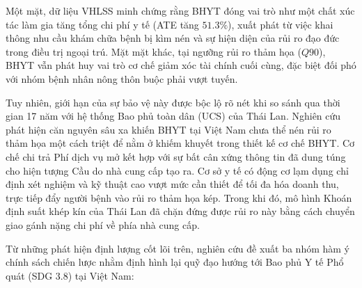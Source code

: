 \documentclass[12pt,a4paper]{article}
\begin{document}
Một mặt, dữ liệu VHLSS minh chứng rằng BHYT đóng vai trò như một chất xúc tác làm gia tăng tổng chi phí y tế (ATE tăng $51.3\%$), xuất phát từ việc khai thông nhu cầu khám chữa bệnh bị kìm nén và sự hiện diện của rủi ro đạo đức trong điều trị ngoại trú. Mặt mặt khác, tại ngưỡng rủi ro thảm họa ($Q90$), BHYT vẫn phát huy vai trò cơ chế giảm xóc tài chính cuối cùng, đặc biệt đối phó với nhóm bệnh nhân nông thôn buộc phải vượt tuyến. 

Tuy nhiên, giới hạn của sự bảo vệ này được bộc lộ rõ nét khi so sánh qua thời gian 17 năm với hệ thống Bao phủ toàn dân (UCS) của Thái Lan. Nghiên cứu phát hiện căn nguyên sâu xa khiến BHYT tại Việt Nam chưa thể nén rủi ro thảm họa một cách triệt để nằm ở khiếm khuyết trong thiết kế cơ chế BHYT. Cơ chế chi trả Phí dịch vụ mở kết hợp với sự bất cân xứng thông tin đã dung túng cho hiện tượng Cầu do nhà cung cấp tạo ra. Cơ sở y tế có động cơ lạm dụng chỉ định xét nghiệm và kỹ thuật cao vượt mức cần thiết để tối đa hóa doanh thu, trực tiếp đẩy người bệnh vào rủi ro thảm họa kép. Trong khi đó, mô hình Khoán định suất khép kín của Thái Lan đã chặn đứng được rủi ro này bằng cách chuyển giao gánh nặng chi phí về phía nhà cung cấp.

Từ những phát hiện định lượng cốt lõi trên, nghiên cứu đề xuất ba nhóm hàm ý chính sách chiến lược nhằm định hình lại quỹ đạo hướng tới Bao phủ Y tế Phổ quát (SDG 3.8) tại Việt Nam:
\end{document}
